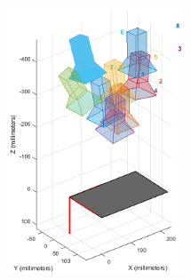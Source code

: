 \documentclass[10pt,twocolumn,letterpaper]{article}
\begin{document}
\begin{figure}[h]
\begin{center}
   \includegraphics[width=0.47\textwidth]{3.2}
\end{center}
\end{figure}
\end{document}
